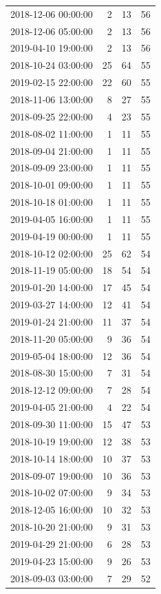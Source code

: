\begin{tabular}{lrrr}
2018-12-06 00:00:00 & 2 & 13 & 56 \\
2018-12-06 05:00:00 & 2 & 13 & 56 \\
2019-04-10 19:00:00 & 2 & 13 & 56 \\
2018-10-24 03:00:00 & 25 & 64 & 55 \\
2019-02-15 22:00:00 & 22 & 60 & 55 \\
2018-11-06 13:00:00 & 8 & 27 & 55 \\
2018-09-25 22:00:00 & 4 & 23 & 55 \\
2018-08-02 11:00:00 & 1 & 11 & 55 \\
2018-09-04 21:00:00 & 1 & 11 & 55 \\
2018-09-09 23:00:00 & 1 & 11 & 55 \\
2018-10-01 09:00:00 & 1 & 11 & 55 \\
2018-10-18 01:00:00 & 1 & 11 & 55 \\
2019-04-05 16:00:00 & 1 & 11 & 55 \\
2019-04-19 00:00:00 & 1 & 11 & 55 \\
2018-10-12 02:00:00 & 25 & 62 & 54 \\
2018-11-19 05:00:00 & 18 & 54 & 54 \\
2019-01-20 14:00:00 & 17 & 45 & 54 \\
2019-03-27 14:00:00 & 12 & 41 & 54 \\
2019-01-24 21:00:00 & 11 & 37 & 54 \\
2018-11-20 05:00:00 & 9 & 36 & 54 \\
2019-05-04 18:00:00 & 12 & 36 & 54 \\
2018-08-30 15:00:00 & 7 & 31 & 54 \\
2018-12-12 09:00:00 & 7 & 28 & 54 \\
2019-04-05 21:00:00 & 4 & 22 & 54 \\
2018-09-30 11:00:00 & 15 & 47 & 53 \\
2018-10-19 19:00:00 & 12 & 38 & 53 \\
2018-10-14 18:00:00 & 10 & 37 & 53 \\
2018-09-07 19:00:00 & 10 & 36 & 53 \\
2018-10-02 07:00:00 & 9 & 34 & 53 \\
2018-12-05 16:00:00 & 10 & 32 & 53 \\
2018-10-20 21:00:00 & 9 & 31 & 53 \\
2019-04-29 21:00:00 & 6 & 28 & 53 \\
2019-04-23 15:00:00 & 9 & 26 & 53 \\
2018-09-03 03:00:00 & 7 & 29 & 52 \\

\end{tabular}

